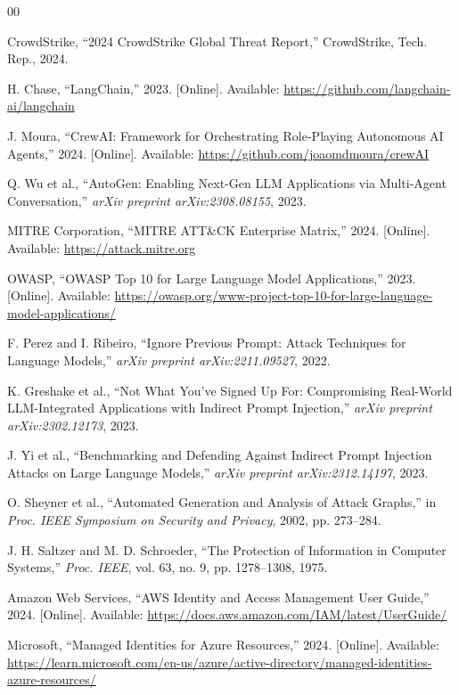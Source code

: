 \documentclass[conference]{IEEEtran}
\begin{document}
\begin{thebibliography}{00}

CrowdStrike, ``2024 CrowdStrike Global Threat Report,'' CrowdStrike, Tech. Rep., 2024.

H. Chase, ``LangChain,'' 2023. [Online]. Available: \url{https://github.com/langchain-ai/langchain}

J. Moura, ``CrewAI: Framework for Orchestrating Role-Playing Autonomous AI Agents,'' 2024.
[Online]. Available: \url{https://github.com/joaomdmoura/crewAI}

Q. Wu et al., ``AutoGen: Enabling Next-Gen LLM Applications via Multi-Agent Conversation,''
\textit{arXiv preprint arXiv:2308.08155}, 2023.

MITRE Corporation, ``MITRE ATT\&CK Enterprise Matrix,'' 2024.
[Online]. Available: \url{https://attack.mitre.org}

OWASP, ``OWASP Top 10 for Large Language Model Applications,'' 2023.
[Online]. Available: \url{https://owasp.org/www-project-top-10-for-large-language-model-applications/}

F. Perez and I. Ribeiro, ``Ignore Previous Prompt: Attack Techniques for Language Models,''
\textit{arXiv preprint arXiv:2211.09527}, 2022.

K. Greshake et al., ``Not What You've Signed Up For: Compromising Real-World LLM-Integrated
Applications with Indirect Prompt Injection,'' \textit{arXiv preprint arXiv:2302.12173}, 2023.

J. Yi et al., ``Benchmarking and Defending Against Indirect Prompt Injection Attacks on
Large Language Models,'' \textit{arXiv preprint arXiv:2312.14197}, 2023.

O. Sheyner et al., ``Automated Generation and Analysis of Attack Graphs,''
in \textit{Proc. IEEE Symposium on Security and Privacy}, 2002, pp. 273--284.

J. H. Saltzer and M. D. Schroeder, ``The Protection of Information in Computer Systems,''
\textit{Proc. IEEE}, vol. 63, no. 9, pp. 1278--1308, 1975.

Amazon Web Services, ``AWS Identity and Access Management User Guide,'' 2024.
[Online]. Available: \url{https://docs.aws.amazon.com/IAM/latest/UserGuide/}

Microsoft, ``Managed Identities for Azure Resources,'' 2024.
[Online]. Available: \url{https://learn.microsoft.com/en-us/azure/active-directory/managed-identities-azure-resources/}


\end{thebibliography}
\end{document}
